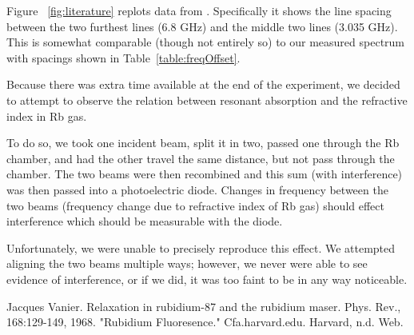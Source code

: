 \documentclass[paper=a4, fontsize=11pt]{scrartcl} %
\numberwithin{equation}{section}
\numberwithin{figure}{section}
\numberwithin{table}{section}
\begin{document}
Figure ~\ref{fig:literature} replots data from
\cite{vanier}. Specifically it shows the line spacing between the two
furthest lines (6.8 GHz) and the middle two lines (3.035 GHz). This is
somewhat comparable (though not entirely so) to our measured spectrum with spacings shown in Table~\ref{table:freqOffset}.


\vspace{3em}

Because there was extra time available at the end of the experiment, we decided to attempt to observe the relation between resonant absorption and the refractive index in Rb gas.

To do so, we took one incident beam, split it in two, passed one through the Rb chamber, and had the other travel the same distance, but not pass through the chamber. The two beams were then recombined and this sum (with interference) was then passed into a photoelectric diode. Changes in frequency between the two beams (frequency change due to refractive index of Rb gas) should effect interference which should be measurable with the diode.

Unfortunately, we were unable to precisely reproduce this effect. We attempted aligning the two beams multiple ways; however, we never were able to see evidence of interference, or if we did, it was too faint to be in any way noticeable.




\begin{thebibliography}{99}
Jacques Vanier. Relaxation in rubidium-87 and the
  rubidium maser. Phys. Rev., 168:129-149, 1968.
"Rubidium Fluoresence." Cfa.harvard.edu. Harvard, n.d. Web.
\end{thebibliography}


\end{document}

